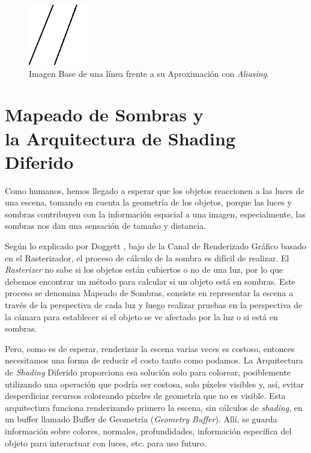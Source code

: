 \documentclass{cslthse-msc}
\begin{document}
\begin{figure}[!hbt]
	\centering
	\includegraphics[scale=0.6]{images/aliasing_example.png} 
	\caption{Imagen Base de una línea frente a su Aproximación con \textit{Aliasing}.}\label{fig:aliasingexample}
\end{figure}

\section[Mapeado de Sombras y la Arquitectura de Shading Diferido]{Mapeado de Sombras y \\ la Arquitectura de Shading Diferido}

Como humanos, hemos llegado a esperar que los objetos reaccionen a las luces de una escena, tomando en cuenta la geometría de los objetos, porque las luces y sombras contribuyen con la información espacial a una imagen, especialmente, las sombras nos dan una sensación de tamaño y distancia.

Según lo explicado por Doggett \cite{Doggett2017EDAN35}, bajo de la Canal de Renderizado Gráfico basado en el Rasterizador, el proceso de cálculo de la sombra es difícil de realizar. El \textit{Rasterizer} no sabe si los objetos están cubiertos o no de una luz, por lo que debemos encontrar un método para calcular si un objeto está en sombras. Este proceso se denomina Mapeado de Sombras, consiste en representar la escena a través de la perspectiva de cada luz y luego realizar pruebas en la perspectiva de la cámara para establecer si el objeto se ve afectado por la luz o si está en sombras.

Pero, como es de esperar, renderizar la escena varias veces es costoso, entonces necesitamos una forma de reducir el costo tanto como podamos. La Arquitectura de \textit{Shading} Diferido proporciona esa solución solo para colorear, posiblemente utilizando una operación que podría ser costosa, solo píxeles visibles y, así, evitar desperdiciar recursos coloreando píxeles de geometría que no es visible. Esta arquitectura funciona renderizando primero la escena, sin cálculos de \textit{shading}, en un buffer llamado Buffer de Geometría (\textit{Geometry Buffer}). Allí, se guarda información sobre colores, normales, profundidades, información específica del objeto para interactuar con luces, etc. para uso futuro.
\end{document}
